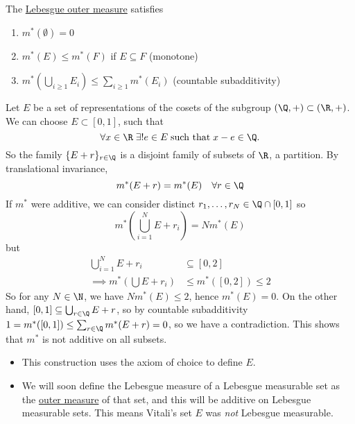 \documentclass{article}
\newcommand{\1}[1]{\mathbbm{1}_{#1}}
\begin{document}
The \hyperlink{def:lebOutMeas}{Lebesgue outer measure} satisfies
\begin{enumerate}
    \item $m^*(\emptyset) = 0$
    \item $m^*(E) \leq m^*(F)$ if $E \subseteq F$ (monotone)
    \item $m^*\left(\bigcup_{i \geq 1} E_i\right) \leq \sum_{i \geq 1} m^* (E_i)$ (countable subadditivity)
\end{enumerate}

\begin{eg}
    Let $E$ be a set of representations of the cosets of the subgroup $(\Q, +) \subset (\R, +)$. We can choose $E \subset [0, 1]$, such that
    \begin{equation*}
        \forall x \in \R \; \exists! e \in E \; \text{such that} \; x - e \in \Q.
    \end{equation*}
    So the family $\{E + r\}_{r \in \Q}$ is a disjoint family of subsets of $\R$, a partition.
    By translational invariance, \begin{equation*}m^*(E + r) = m^*(E) \quad \forall r \in \Q\end{equation*}
    If $m^*$ were additive, we can consider distinct $r_1, \dotsc, r_N \in \Q \cap [0, 1]$ so
    \begin{equation*}
        m^*\left(\bigcup_{i=1}^N E + r_i\right) = N m^*(E)
    \end{equation*}
    but
    \begin{align*}
        \bigcup_{i=1}^N E + r_i &\subseteq [0, 2] \\
        \implies m^*\left(\bigcup E + r_i\right) &\leq m^*([0, 2]) \leq 2
    \end{align*}
    So for any $N \in \N$, we have $N m^*(E) \leq 2$, hence $m^*(E) = 0$.
    On the other hand, $[0, 1] \subseteq \bigcup_{r \in \Q} E + r$, so by countable subadditivity $1 = m^*([0, 1]) \leq \sum_{r \in \Q} m^*(E + r) = 0$, so we have a contradiction.
    This shows that $m^*$ is not additive on all subsets.
\end{eg}

\begin{remark} \leavevmode
    \begin{itemize}
        \item This construction uses the axiom of choice to define $E$.
        \item We will soon define the Lebesgue measure of a Lebesgue measurable set as the \hyperlink{def:lebOutMeas}{outer measure} of that set, and this will be additive on Lebesgue measurable sets.  This means Vitali's set $E$ was \emph{not} Lebesgue measurable.
    \end{itemize}
\end{remark}
\end{document}
